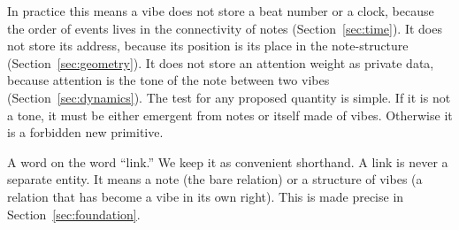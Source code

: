 In practice this means a vibe does not store a beat number or a clock, because the order of events lives in the connectivity of notes (Section~\ref{sec:time}). It does not store its address, because its position is its place in the note-structure (Section~\ref{sec:geometry}). It does not store an attention weight as private data, because attention is the tone of the note between two vibes (Section~\ref{sec:dynamics}). The test for any proposed quantity is simple. If it is not a tone, it must be either emergent from notes or itself made of vibes. Otherwise it is a forbidden new primitive.

A word on the word ``link.'' We keep it as convenient shorthand. A link is never a separate entity. It means a note (the bare relation) or a structure of vibes (a relation that has become a vibe in its own right). This is made precise in Section~\ref{sec:foundation}.
